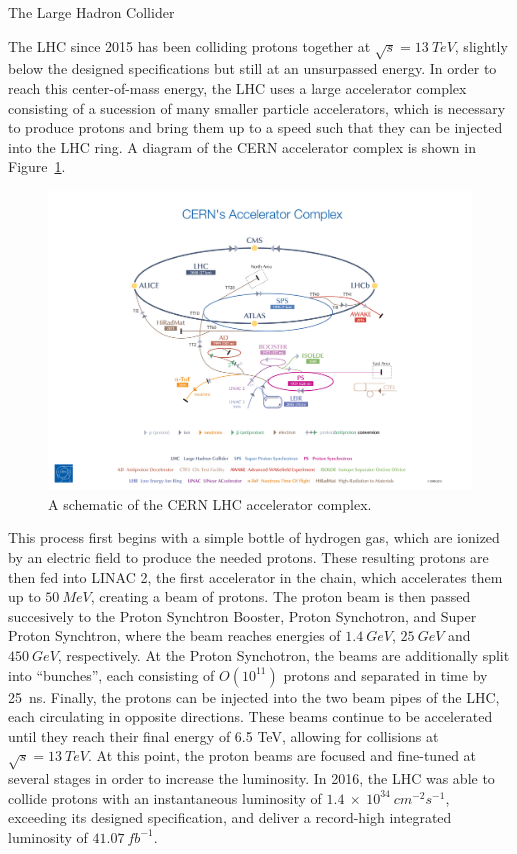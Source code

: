 \begin{section}{The Large Hadron Collider}

The LHC since 2015 has been colliding protons together at $\sqrt{s} = 13~TeV$, slightly below the designed specifications but still at an unsurpassed energy.
In order to reach this center-of-mass energy, the LHC uses a large accelerator complex consisting of a sucession of many smaller particle accelerators, which is necessary to produce protons and bring them up to a speed such that they can be injected into the LHC ring.
A diagram of the CERN accelerator complex is shown in Figure~\ref{fig:lhc_accelerator_complex}.

\begin{figure}[tbp!]
\begin{center}
\includegraphics[angle=0,width=0.95\columnwidth]{fig/lhc_accelerator_complex.jpg}
\end{center}
\caption{A schematic of the CERN LHC accelerator complex.}
\label{fig:lhc_accelerator_complex}
\end{figure}

This process first begins with a simple bottle of hydrogen gas, which are ionized by an electric field to produce the needed protons.
These resulting protons are then fed into LINAC 2, the first accelerator in the chain, which accelerates them up to $50~MeV$, creating a beam of protons.
The proton beam is then passed succesively to the Proton Synchtron Booster, Proton Synchotron, and Super Proton Synchtron, where the beam reaches energies of $1.4~GeV$, $25~GeV$ and $450~GeV$, respectively.
At the Proton Synchotron, the beams are additionally split into ``bunches'', each consisting of $O(10^{11})$ protons and separated in time by 25~ns. 
Finally, the protons can be injected into the two beam pipes of the LHC, each circulating in opposite directions. 
These beams continue to be accelerated until they reach their final energy of 6.5 TeV, allowing for collisions at $\sqrt{s} = 13~TeV$.
At this point, the proton beams are focused and fine-tuned at several stages in order to increase the luminosity. 
In 2016, the LHC was able to collide protons with an instantaneous luminosity of $1.4~\times~10^{34}~cm^{-2}s^{-1}$, exceeding its designed specification, and deliver a record-high integrated luminosity of $41.07~fb^{-1}$.


\end{section}
